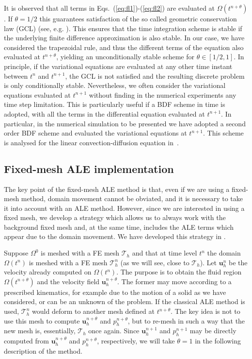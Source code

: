 \documentclass[11pt,a4paper,oneside,reqno]{amsart}
\newcommand{\Eq}[1]{(\ref{eq:#1})}
\def\u{{\bm u}}
\begin{document}
It is observed that all terms in Eqs.~\Eq{fl1}-\Eq{fl2} are evaluated at $\Omega(t^{n+\theta})$. If $\theta = 1/2$ this guarantees satisfaction of the so called geometric conservation law (GCL) (see, e.g. \cite{boffig1}). This ensures that the time integration scheme is stable if the underlying finite difference approximation is also stable. In our case, we have considered the trapezoidal rule, and thus the different terms of the equation also evaluated at $t^{n+\theta}$, yielding an unconditionally stable scheme for $\theta\in [1/2, 1]$. In principle, if the variational equations are evaluated at any other time instant between $t^n$ and $t^{n+1}$, the GCL is not satisfied and the resulting discrete problem is only conditionally stable. Nevertheless, we often consider the variational equations evaluated at $t^{n+1}$ without finding in the numerical experiments any time step limitation. This is particularly useful if a BDF scheme in time is adopted, with all the terms in the differential equation evaluated at $t^{n+1}$. In particular, in the numerical simulation to be presented we have adopted a second order BDF scheme and evaluated the variational equations at $t^{n+1}$. This scheme is analysed for the linear convection-diffusion equation in~\cite{badia-codina-2006-1}.

\subsection{Fixed-mesh ALE implementation}

The key point of the fixed-mesh ALE method is that, even if we are using a fixed-mesh method, domain movement cannot be obviated, and it is necessary to take it into account with an ALE method. However, since we are interested in using a fixed mesh, we develop a strategy which allows us to always work with the background fixed mesh and, at the same time, includes the ALE terms which appear due to the domain movement. We have developed this strategy in \cite{houzeauxc4,codina-et-al-2009-2,cowenc2,baiges-codina-2010-1}.

Suppose $\Omega^0$ is meshed with a FE mesh $\mathcal{T}_h$ and that at time level $t^n$ the domain $\Omega(t^n)$ is meshed with a FE mesh $\mathcal{T}^n_h$ (as we will see, close to $\mathcal{T}_h$). Let $\u^n_h$ be the velocity already computed on $\Omega(t^n)$. The purpose is to obtain the fluid region $\Omega(t^{n+\theta})$ and the velocity field $\u_h^{n+\theta}$. The former may move according to a prescribed kinematics, for example due to the motion of a solid as we have considered, or can be an unknown of the problem. If the classical ALE method is used, $\mathcal{T}^n_h$ would deform to another mesh defined at $t^{n+\theta}$. The key idea is not to use this mesh to compute $\u_h^{n+\theta}$ and $p_h^{n+\theta}$, but to re-mesh in such a way that the new mesh is, essentially, $\mathcal{T}_h$ once again. Since $\u_h^{n+1}$ and $p_h^{n+1}$ may be directly computed from $\u_h^{n+\theta}$ and  $p_h^{n+\theta}$, respectively, we will take $\theta = 1$ in the following description of the method.  
\end{document}
